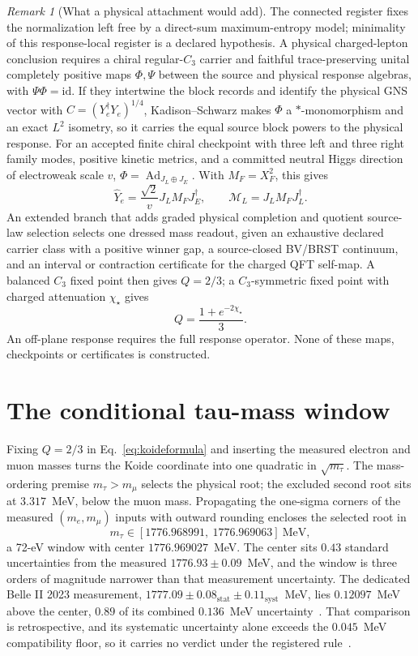 \documentclass[11pt]{article}
\theoremstyle{remark}
\newtheorem{remark}[theorem]{Remark}
\begin{document}
\begin{remark}[What a physical attachment would add]
\label{rem:attachment}
The connected register fixes the normalization left free by a direct-sum
maximum-entropy model; minimality of this response-local register is a
declared hypothesis. A physical charged-lepton conclusion requires a chiral
regular-\(C_3\) carrier and faithful trace-preserving unital completely
positive maps \(\Phi,\Psi\) between the source and physical response
algebras, with \(\Psi\Phi=\mathrm{id}\). If they intertwine the block
records and identify the physical GNS vector with
\(C=(Y_e^\dagger Y_e)^{1/4}\), Kadison--Schwarz makes \(\Phi\) a
\(*\)-monomorphism and an exact \(L^2\) isometry, so it carries the equal
source block powers to the physical response. For an accepted finite chiral
checkpoint with three left and three right family modes, positive kinetic
metrics, and a committed neutral Higgs direction of electroweak scale \(v\),
\(\Phi=\operatorname{Ad}_{J_L\oplus J_E}\). With \(M_F=X_F^2\), this gives
\[
\widehat Y_e=\frac{\sqrt2}{v}J_LM_FJ_E^\dagger,
\qquad
\mathcal M_L=J_LM_FJ_L^\dagger.
\]
An extended branch that adds graded physical completion and quotient
source-law selection selects one dressed mass readout, given an exhaustive
declared carrier class with a positive winner gap, a source-closed BV/BRST
continuum, and an interval or contraction certificate for the charged QFT
self-map. A balanced \(C_3\) fixed point then gives \(Q=2/3\); a
\(C_3\)-symmetric fixed point with charged attenuation \(\chi_\star\) gives
\[
Q=\frac{1+e^{-2\chi_\star}}{3}.
\]
An off-plane response requires the full response operator. None of these
maps, checkpoints or certificates is constructed.
\end{remark}

\section{The conditional tau-mass window}
\label{sec:tauwindow}

Fixing \(Q=2/3\) in Eq.~\eqref{eq:koideformula} and inserting the measured
electron and muon masses turns the Koide coordinate into one quadratic in
\(\sqrt{m_\tau}\). The mass-ordering premise \(m_\tau>m_\mu\) selects the
physical root; the excluded second root sits at \(3.317\)~MeV, below the
muon mass. Propagating the one-sigma corners of the measured
\((m_e,m_\mu)\) inputs \cite{pdg2026} with outward rounding encloses the
selected root in
\begin{equation}
m_\tau\in[1776.968991,\ 1776.969063]\ \mathrm{MeV},
\label{eq:tauwindow}
\end{equation}
a 72-eV window with center \(1776.969027\)~MeV. The center sits
\(0.43\) standard uncertainties from the measured
\(1776.93\pm0.09\)~MeV, and the window is three orders of magnitude
narrower than that measurement uncertainty. The dedicated Belle II 2023
measurement, \(1777.09\pm0.08_{\mathrm{stat}}\pm0.11_{\mathrm{syst}}\)~MeV,
lies \(0.12097\)~MeV above the center, \(0.89\) of its combined
\(0.136\)~MeV uncertainty~\cite{belle2023tau}. That comparison is
retrospective, and its systematic uncertainty alone exceeds the
\(0.045\)~MeV compatibility floor, so it carries no verdict under the
registered rule~\cite{ophpublicdata}.
\end{document}
